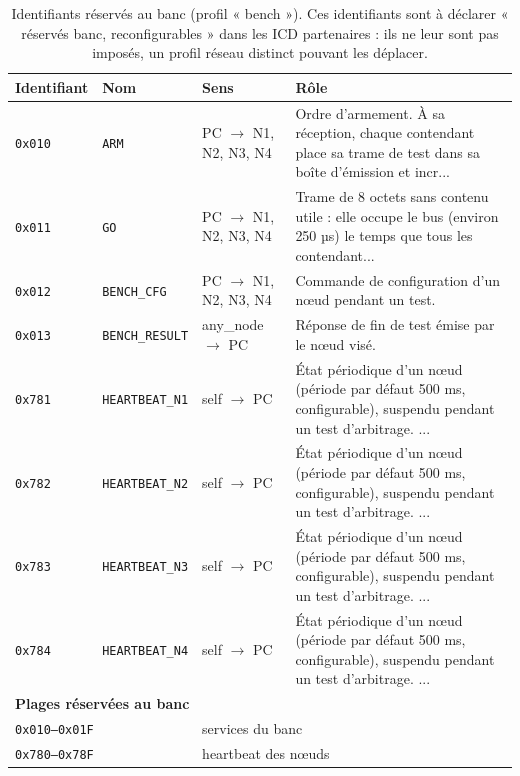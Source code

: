 
\begin{table}[H]
\centering\small
\begin{tabular}{llll}
\toprule
\textbf{Identifiant} & \textbf{Nom} & \textbf{Sens} & \textbf{Rôle} \\
\midrule
\texttt{0x010} & \texttt{ARM} & PC $\rightarrow$ N1, N2, N3, N4 & Ordre d'armement. À sa réception, chaque contendant place sa trame de test dans sa boîte d'émission et incr... \\
\texttt{0x011} & \texttt{GO} & PC $\rightarrow$ N1, N2, N3, N4 & Trame de 8 octets sans contenu utile : elle occupe le bus (environ 250 µs) le temps que tous les contendant... \\
\texttt{0x012} & \texttt{BENCH\_CFG} & PC $\rightarrow$ N1, N2, N3, N4 & Commande de configuration d'un nœud pendant un test. \\
\texttt{0x013} & \texttt{BENCH\_RESULT} & any\_node $\rightarrow$ PC & Réponse de fin de test émise par le nœud visé. \\
\texttt{0x781} & \texttt{HEARTBEAT\_N1} & self $\rightarrow$ PC & État périodique d'un nœud (période par défaut 500 ms, configurable), suspendu pendant un test d'arbitrage. ... \\
\texttt{0x782} & \texttt{HEARTBEAT\_N2} & self $\rightarrow$ PC & État périodique d'un nœud (période par défaut 500 ms, configurable), suspendu pendant un test d'arbitrage. ... \\
\texttt{0x783} & \texttt{HEARTBEAT\_N3} & self $\rightarrow$ PC & État périodique d'un nœud (période par défaut 500 ms, configurable), suspendu pendant un test d'arbitrage. ... \\
\texttt{0x784} & \texttt{HEARTBEAT\_N4} & self $\rightarrow$ PC & État périodique d'un nœud (période par défaut 500 ms, configurable), suspendu pendant un test d'arbitrage. ... \\
\midrule
\multicolumn{4}{l}{\textbf{Plages réservées au banc}} \\
\multicolumn{2}{l}{\texttt{0x010--0x01F}} & \multicolumn{2}{l}{services du banc} \\
\multicolumn{2}{l}{\texttt{0x780--0x78F}} & \multicolumn{2}{l}{heartbeat des nœuds} \\
\bottomrule
\end{tabular}
\caption{Identifiants réservés au banc (profil « bench »). Ces identifiants sont à déclarer « réservés banc, reconfigurables » dans les ICD partenaires : ils ne leur sont pas imposés, un profil réseau distinct pouvant les déplacer.}
\label{tab:icd-reserves}
\end{table}
